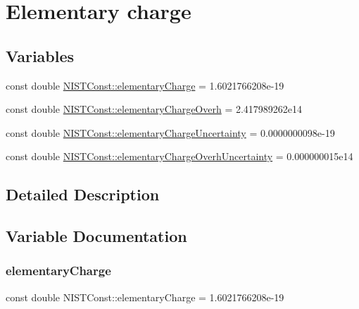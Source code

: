 \hypertarget{group___elementary_charge}{}\section{Elementary charge}
\label{group___elementary_charge}
\subsection*{Variables}
\begin{DoxyCompactItemize}
\item 
const double \hyperlink{group___elementary_charge_gaaa025a77a5281c83628ff8cb46f8038f}{N\+I\+S\+T\+Const\+::elementary\+Charge} = 1.\+6021766208e-\/19
\item 
const double \hyperlink{group___elementary_charge_ga262dea92054df909a97626e3c804f1b4}{N\+I\+S\+T\+Const\+::elementary\+Charge\+Overh} = 2.\+417989262e14
\item 
const double \hyperlink{group___elementary_charge_ga8e2ed13fe11bd4253e61c6f893a6778d}{N\+I\+S\+T\+Const\+::elementary\+Charge\+Uncertainty} = 0.\+0000000098e-\/19
\item 
const double \hyperlink{group___elementary_charge_gadc450d412ab46877fee4e29d8ccf7ce3}{N\+I\+S\+T\+Const\+::elementary\+Charge\+Overh\+Uncertainty} = 0.\+000000015e14
\end{DoxyCompactItemize}


\subsection{Detailed Description}


\subsection{Variable Documentation}
\mbox{\label{group___elementary_charge_gaaa025a77a5281c83628ff8cb46f8038f}} 
\subsubsection{\texorpdfstring{elementary\+Charge}{elementaryCharge}}
{\footnotesize\ttfamily const double N\+I\+S\+T\+Const\+::elementary\+Charge = 1.\+6021766208e-\/19}

